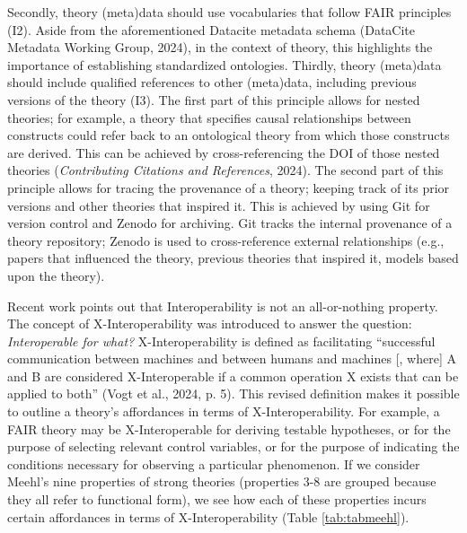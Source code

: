 \documentclass[
  man, noextraspace,floatsintext]{apa7}
\begin{document}
Secondly, theory (meta)data should use vocabularies that follow FAIR principles (I2).
Aside from the aforementioned Datacite metadata schema (DataCite Metadata Working Group, 2024),
in the context of theory, this highlights the importance of establishing standardized ontologies.
Thirdly, theory (meta)data should include qualified references to other (meta)data, including previous versions of the theory (I3).
The first part of this principle allows for nested theories;
for example, a theory that specifies causal relationships between constructs could refer back to an ontological theory from which those constructs are derived.
This can be achieved by cross-referencing the DOI of those nested theories (\emph{Contributing {Citations} and {References}}, 2024).
The second part of this principle allows for tracing the provenance of a theory; keeping track of its prior versions and other theories that inspired it.
This is achieved by using Git for version control and Zenodo for archiving.
Git tracks the internal provenance of a theory repository; Zenodo is used to cross-reference external relationships (e.g., papers that influenced the theory, previous theories that inspired it, models based upon the theory).

Recent work points out that Interoperability is not an all-or-nothing property.
The concept of X-Interoperability was introduced to answer the question: \emph{Interoperable for what?}
X-Interoperability is defined as facilitating ``successful communication between machines and between humans and machines {[}, where{]} A and B are considered X-Interoperable if a common operation X exists that can be applied to both'' (Vogt et al., 2024, p. 5).
This revised definition makes it possible to outline a theory's affordances in terms of X-Interoperability.
For example, a FAIR theory may be X-Interoperable for deriving testable hypotheses,
or for the purpose of selecting relevant control variables,
or for the purpose of indicating the conditions necessary for observing a particular phenomenon.
If we consider Meehl's nine properties of strong theories (properties 3-8 are grouped because they all refer to functional form),
we see how each of these properties incurs certain affordances in terms of X-Interoperability (Table \ref{tab:tabmeehl}).
\end{document}
